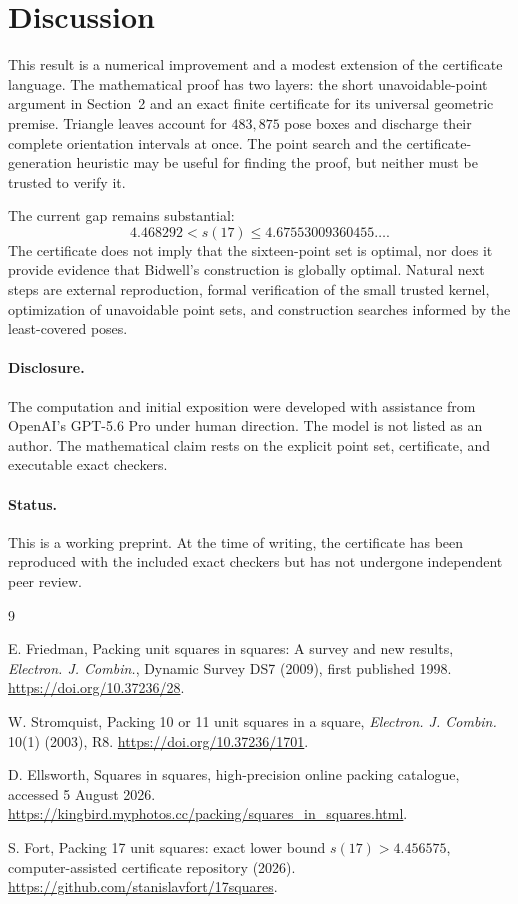 \documentclass[11pt]{article}
\theoremstyle{definition}
\theoremstyle{remark}
\begin{document}
\section{Discussion}

This result is a numerical improvement and a modest extension of the
certificate language.  The mathematical proof has two layers: the short
unavoidable-point argument in Section~2 and an exact finite certificate for its
universal geometric premise.  Triangle leaves account for $483{,}875$ pose
boxes and discharge their complete orientation intervals at once.  The point
search and the certificate-generation heuristic may be useful for finding the
proof, but neither must be trusted to verify it.

The current gap remains substantial:
\[
  4.468292 < s(17) \le 4.67553009360455\ldots.
\]
The certificate does not imply that the sixteen-point set is optimal, nor does
it provide evidence that Bidwell's construction is globally optimal.  Natural
next steps are external reproduction, formal verification of the small trusted
kernel, optimization of unavoidable point sets, and
construction searches informed by the least-covered poses.

\paragraph{Disclosure.}
The computation and initial exposition were developed with assistance from
OpenAI's GPT-5.6 Pro under human direction.  The model is not listed as an
author.  The mathematical claim rests on the explicit point set, certificate,
and executable exact checkers.

\paragraph{Status.}
This is a working preprint.  At the time of writing, the certificate has been
reproduced with the included exact checkers but has not undergone independent
peer review.

\begin{thebibliography}{9}

E. Friedman,
\newblock Packing unit squares in squares: A survey and new results,
\newblock \emph{Electron. J. Combin.}, Dynamic Survey DS7 (2009),
  first published 1998.
\newblock \url{https://doi.org/10.37236/28}.

W. Stromquist,
\newblock Packing 10 or 11 unit squares in a square,
\newblock \emph{Electron. J. Combin.} 10(1) (2003), R8.
\newblock \url{https://doi.org/10.37236/1701}.

D. Ellsworth,
\newblock Squares in squares,
\newblock high-precision online packing catalogue, accessed 5 August 2026.
\newblock \url{https://kingbird.myphotos.cc/packing/squares_in_squares.html}.

S. Fort,
\newblock Packing 17 unit squares: exact lower bound $s(17)>4.456575$,
\newblock computer-assisted certificate repository (2026).
\newblock \url{https://github.com/stanislavfort/17squares}.

\end{thebibliography}
\end{document}
